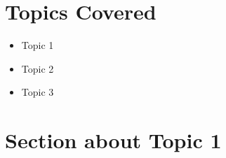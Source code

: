 \documentclass[11pt]{article}
\begin{document}

\section{Topics Covered}

\begin{itemize}
	\item Topic 1
	\item Topic 2
	\item Topic 3
\end{itemize}
\medskip

\section{Section about Topic 1}



\end{document}
